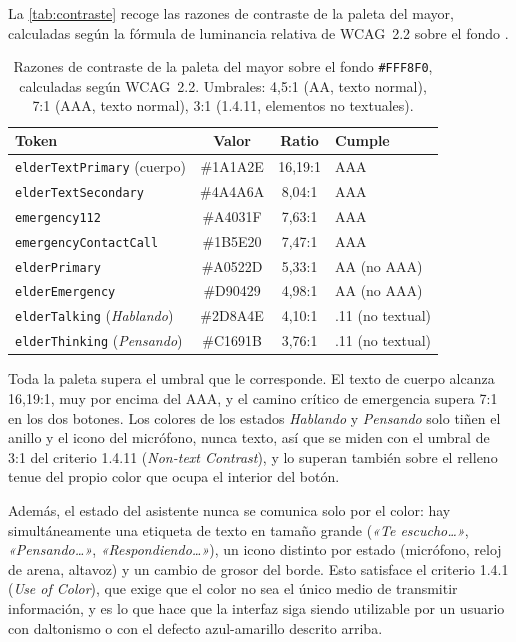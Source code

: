 La \autoref{tab:contraste} recoge las razones de contraste de la paleta del mayor, calculadas según la
fórmula de luminancia relativa de WCAG~2.2 \autocite{wcag} sobre el fondo .

\begin{table}[htbp]
    \centering
    \begin{tabularx}{\textwidth}{@{}>{\RaggedRight\arraybackslash}X c c >{\RaggedRight\arraybackslash}X@{}}
        \toprule
        \textbf{Token} & \textbf{Valor} & \textbf{Ratio} & \textbf{Cumple} \\
        \midrule
        \texttt{elderTextPrimary} (cuerpo)    & \#1A1A2E & 16{,}19:1 & AAA \\
        \texttt{elderTextSecondary}            & \#4A4A6A & 8{,}04:1  & AAA \\
        \texttt{emergency112}                  & \#A4031F & 7{,}63:1  & AAA \\
        \texttt{emergencyContactCall}          & \#1B5E20 & 7{,}47:1  & AAA \\
        \texttt{elderPrimary}                  & \#A0522D & 5{,}33:1  & AA (no AAA) \\
        \texttt{elderEmergency}                & \#D90429 & 4{,}98:1  & AA (no AAA) \\
        \texttt{elderTalking} (\emph{Hablando})  & \#2D8A4E & 4{,}10:1  & 1.4.11 (no textual) \\
        \texttt{elderThinking} (\emph{Pensando}) & \#C1691B & 3{,}76:1  & 1.4.11 (no textual) \\
        \bottomrule
    \end{tabularx}
    \caption{Razones de contraste de la paleta del mayor sobre el fondo \texttt{\#FFF8F0}, calculadas
    según WCAG~2.2. Umbrales: 4{,}5:1 (AA, texto normal), 7:1 (AAA, texto normal), 3:1 (1.4.11, elementos
    no textuales).}
    \label{tab:contraste}
\end{table}

Toda la paleta supera el umbral que le corresponde. El texto de cuerpo alcanza 16{,}19:1, muy por encima
del AAA, y el camino crítico de emergencia supera 7:1 en los dos botones. Los colores de los estados
\emph{Hablando} y \emph{Pensando} solo tiñen el anillo y el icono del micrófono, nunca texto, así que se
miden con el umbral de 3:1 del criterio 1.4.11 (\emph{Non-text Contrast}), y lo superan también sobre el
relleno tenue del propio color que ocupa el interior del botón.

Además, el estado del asistente nunca se comunica solo por el color: hay simultáneamente una etiqueta de
texto en tamaño grande (\emph{«Te escucho\ldots»}, \emph{«Pensando\ldots»}, \emph{«Respondiendo\ldots»}),
un icono distinto por estado (micrófono, reloj de arena, altavoz) y un cambio de grosor del borde. Esto
satisface el criterio 1.4.1 (\emph{Use of Color}), que exige que el color no sea el único medio de
transmitir información, y es lo que hace que la interfaz siga siendo utilizable por un usuario con
daltonismo o con el defecto azul-amarillo descrito arriba.

